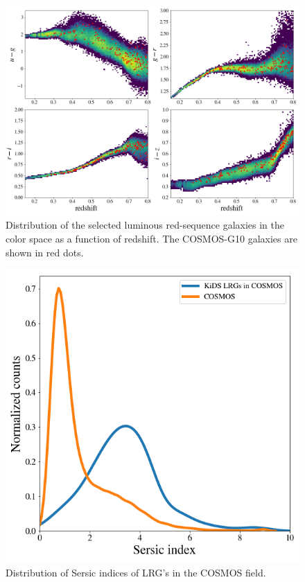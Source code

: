 \documentclass[fleqn,usenatbib,useAMS]{mnras}
\begin{document}
\begin{figure}
\includegraphics[width=\textwidth]{figures_tmp/cosmos_color.png}
\caption{\label{fig:cosmos_color}Distribution of the selected luminous red-sequence galaxies in 
the color space as a function of redshift. The COSMOS-G10 galaxies are shown in red dots.} 
\end{figure}

\begin{figure}
\includegraphics[width=\columnwidth]{figures_tmp/cosmos_sersic.png}
\caption{\label{fig:cosmos_sersic}Distribution of Sersic indices of LRG's in the COSMOS field.} 
\end{figure}
\end{document}
